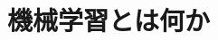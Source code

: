 \documentclass[../../topic_machine-learning]{subfiles}
\begin{document}
\chapter{機械学習とは何か}



\end{document}

